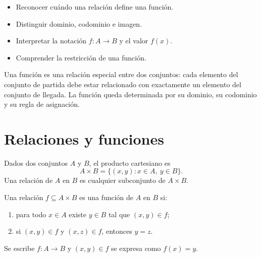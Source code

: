 \ifdefined\documentoSemanal
\else
\usepackage{tikz}
\usepackage{float}
\usepackage{estilo_apuntes}
\usetikzlibrary{arrows.meta,positioning,babel}


\fi
{}

\begin{objetivos}
\begin{itemize}
  \item Reconocer cuándo una relación define una función.
  \item Distinguir dominio, codominio e imagen.
  \item Interpretar la notación $f:A\to B$ y el valor $f(x)$.
  \item Comprender la restricción de una función.
\end{itemize}
\end{objetivos}      

\begin{resumen}
Una función es una relación especial entre dos conjuntos: cada elemento del conjunto de partida debe estar relacionado con exactamente un elemento del conjunto de llegada. La función queda determinada por su dominio, su codominio y su regla de asignación.
\end{resumen}

\section*{Relaciones y funciones}

Dados dos conjuntos $A$ y $B$, el producto cartesiano es
\[
A\times B=\{(x,y):x\in A,\ y\in B\}.
\]
Una relación de $A$ en $B$ es cualquier subconjunto de $A\times B$.

\begin{definicion}[función]
Una relación $f\subseteq A\times B$ es una función de $A$ en $B$ si:
\begin{enumerate}
  \item para todo $x\in A$ existe $y\in B$ tal que $(x,y)\in f$;
  \item si $(x,y)\in f$ y $(x,z)\in f$, entonces $y=z$.
\end{enumerate}
Se escribe $f:A\to B$ y $(x,y)\in f$ se expresa como $f(x)=y$.
\end{definicion}


